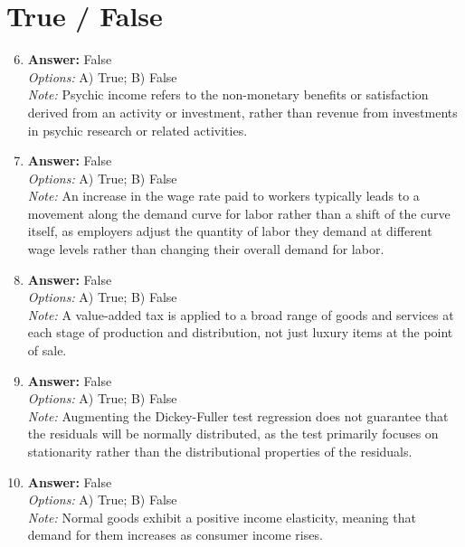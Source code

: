 \documentclass[12pt]{article}
\begin{document}
\section*{True / False}
\begin{enumerate}[label=\arabic*.]
\setcounter{enumi}{5}
\item \textbf{Answer:} False
\\ \textit{Options:} A) True; B) False
\\ \textit{Note:} Psychic income refers to the non-monetary benefits or satisfaction derived from an activity or investment, rather than revenue from investments in psychic research or related activities.
\item \textbf{Answer:} False
\\ \textit{Options:} A) True; B) False
\\ \textit{Note:} An increase in the wage rate paid to workers typically leads to a movement along the demand curve for labor rather than a shift of the curve itself, as employers adjust the quantity of labor they demand at different wage levels rather than changing their overall demand for labor.
\item \textbf{Answer:} False
\\ \textit{Options:} A) True; B) False
\\ \textit{Note:} A value-added tax is applied to a broad range of goods and services at each stage of production and distribution, not just luxury items at the point of sale.
\item \textbf{Answer:} False
\\ \textit{Options:} A) True; B) False
\\ \textit{Note:} Augmenting the Dickey-Fuller test regression does not guarantee that the residuals will be normally distributed, as the test primarily focuses on stationarity rather than the distributional properties of the residuals.
\item \textbf{Answer:} False
\\ \textit{Options:} A) True; B) False
\\ \textit{Note:} Normal goods exhibit a positive income elasticity, meaning that demand for them increases as consumer income rises.
\end{enumerate}
\end{document}
